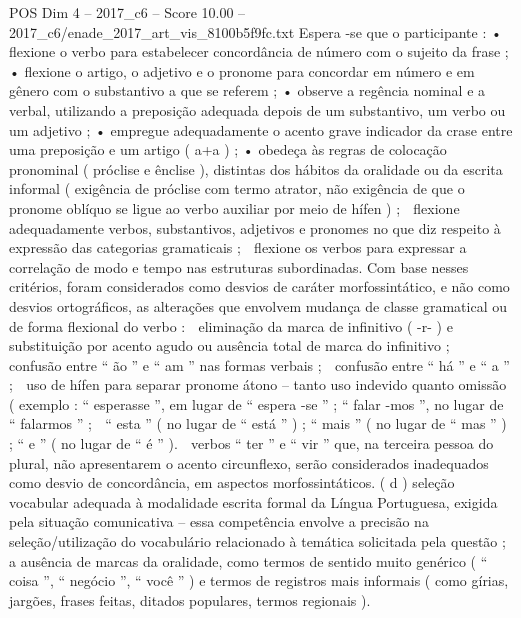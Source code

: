 \begin{textsample}{POS Dim 4 – 2017\_c6 – Score 10.00 – 2017\_c6/enade\_2017\_art\_vis\_8100b5f9fc.txt}
Espera -se que o participante : • flexione o verbo para estabelecer concordância de número com o sujeito da frase ; • flexione o artigo, o adjetivo e o pronome para concordar em número e em gênero com o substantivo a que se referem ; • observe a regência nominal e a verbal, utilizando a preposição adequada depois de um substantivo, um verbo ou um adjetivo ; • empregue adequadamente o acento grave indicador da crase entre uma preposição e um artigo ( a+a ) ; • obedeça às regras de colocação pronominal ( próclise e ênclise ), distintas dos hábitos da oralidade ou da escrita informal ( exigência de próclise com termo atrator, não exigência de que o pronome oblíquo se ligue ao verbo auxiliar por meio de hífen ) ;  flexione adequadamente verbos, substantivos, adjetivos e pronomes no que diz respeito à expressão das categorias gramaticais ;  flexione os verbos para expressar a correlação de modo e tempo nas estruturas subordinadas.
Com base nesses critérios, foram considerados como desvios de caráter morfossintático, e não como desvios ortográficos, as alterações que envolvem mudança de classe gramatical ou de forma flexional do verbo :  eliminação da marca de infinitivo ( -r- ) e substituição por acento agudo ou ausência total de marca do infinitivo ;  confusão entre “ ão ” e “ am ” nas formas verbais ;  confusão entre “ há ” e “ a ” ;  uso de hífen para separar pronome átono – tanto uso indevido quanto omissão ( exemplo : “ esperasse ”, em lugar de “ espera -se ” ; “ falar -mos ”, no lugar de “ falarmos ” ;  “ esta ” ( no lugar de “ está ” ) ; “ mais ” ( no lugar de “ mas ” ) ; “ e ” ( no lugar de “ é ” ).  verbos “ ter ” e “ vir ” que, na terceira pessoa do plural, não apresentarem o acento circunflexo, serão considerados inadequados como desvio de concordância, em aspectos morfossintáticos. ( d ) seleção vocabular adequada à modalidade escrita formal da Língua Portuguesa, exigida pela situação comunicativa – essa competência envolve a precisão na seleção/utilização do vocabulário relacionado à temática solicitada pela questão ; a ausência de marcas da oralidade, como termos de sentido muito genérico ( “ coisa ”, “ negócio ”, “ você ” ) e termos de registros mais informais ( como gírias, jargões, frases feitas, ditados populares, termos regionais ).

\end{textsample}
